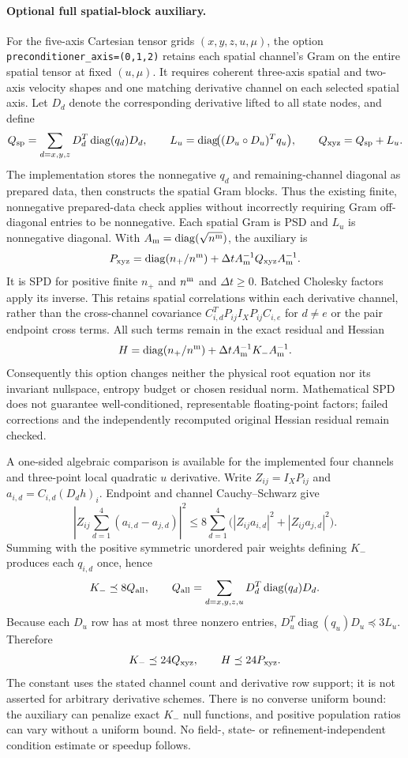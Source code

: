 \documentclass[11pt,letterpaper]{article}
\begin{document}
\paragraph{Optional full spatial-block auxiliary.}
For the five-axis Cartesian tensor grids $(x,y,z,u,\mu)$, the option
\texttt{preconditioner\_axis=(0,1,2)} retains each spatial channel's Gram
on the entire spatial tensor at fixed $(u,\mu)$. It requires coherent three-axis
spatial and two-axis velocity shapes and one matching derivative channel on
each selected spatial axis. Let $D_d$ denote the corresponding derivative
lifted to all state nodes, and define
\[
 Q_{\rm sp}=\sum_{d=x,y,z}D_d^T\operatorname{diag}(q_d)D_d,
 \qquad
 L_u=\operatorname{diag}\!\bigl((D_u\circ D_u)^Tq_u\bigr),
 \qquad Q_{\rm xyz}=Q_{\rm sp}+L_u.
\]
The implementation stores the nonnegative $q_d$ and remaining-channel diagonal
as prepared data, then constructs the spatial Gram blocks. Thus the existing
finite, nonnegative prepared-data check applies without incorrectly requiring
Gram off-diagonal entries to be nonnegative. Each spatial Gram is PSD and
$L_u$ is nonnegative diagonal. With
$A_{\rm m}=\operatorname{diag}(\sqrt{n^{\rm m}})$, the auxiliary is
\[
 P_{\rm xyz}=\operatorname{diag}(n_+/n^{\rm m})
             +\Delta t A_{\rm m}^{-1}Q_{\rm xyz}A_{\rm m}^{-1}.
\]
It is SPD for positive finite $n_+$ and $n^{\rm m}$ and $\Delta t\ge0$.
Batched Cholesky factors apply its inverse. This retains spatial correlations
within each derivative channel, rather than the cross-channel covariance
$C_{i,d}^TP_{ij}I_XP_{ij}C_{i,e}$ for $d\ne e$ or the pair endpoint cross
terms. All such terms remain in the exact residual and Hessian
\[
 H=\operatorname{diag}(n_+/n^{\rm m})
                     +\Delta t A_{\rm m}^{-1}K_-A_{\rm m}^{-1}.
\]
Consequently this option changes neither the physical root equation nor its
invariant nullspace, entropy budget or chosen residual norm. Mathematical
SPD does not guarantee well-conditioned, representable floating-point factors;
failed corrections and the independently recomputed original Hessian residual
remain checked.

A one-sided algebraic comparison is available for the implemented four
channels and three-point local quadratic $u$ derivative. Write
$Z_{ij}=I_XP_{ij}$ and $a_{i,d}=C_{i,d}(D_dh)_i$. Endpoint and channel
Cauchy--Schwarz give
\[
 \left|Z_{ij}\sum_{d=1}^4(a_{i,d}-a_{j,d})\right|^2
 \le8\sum_{d=1}^4\bigl(|Z_{ij}a_{i,d}|^2+|Z_{ij}a_{j,d}|^2\bigr).
\]
Summing with the positive symmetric unordered pair weights defining $K_-$
produces each $q_{i,d}$ once, hence
\[
 K_-\preceq8Q_{\rm all},\qquad
 Q_{\rm all}=\sum_{d=x,y,z,u}D_d^T\operatorname{diag}(q_d)D_d.
\]
Because each $D_u$ row has at most three nonzero entries,
$D_u^T\operatorname{diag}(q_u)D_u\preceq3L_u$. Therefore
\[
 K_-\preceq24Q_{\rm xyz},\qquad H\preceq24P_{\rm xyz}.
\]
The constant uses the stated channel count and derivative row support; it is
not asserted for arbitrary derivative schemes. There is no converse uniform
bound: the auxiliary can penalize exact $K_-$ null functions, and positive
population ratios can vary without a uniform bound. No field-, state- or
refinement-independent condition estimate or speedup follows.
\end{document}
